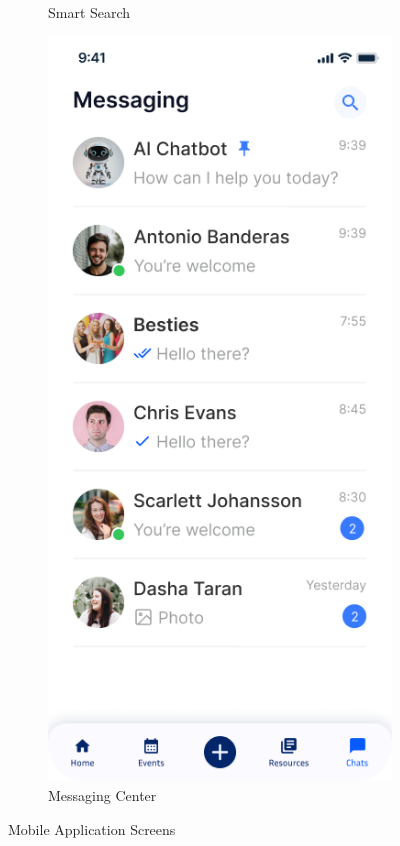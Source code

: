 \begin{figure}[H]
\begin{subfigure}[b]{0.22\textwidth}
        \caption{Smart Search}
        \label{fig:mobile-search}
    \end{subfigure}
    \hfill
    \begin{subfigure}[b]{0.22\textwidth}
        \centering
        \includegraphics[width=\textwidth,height=0.3\textheight,keepaspectratio]{images/front_end_screens/mobile-chats.png}
        \caption{Messaging Center}
        \label{fig:mobile-messaging}
    \end{subfigure}
    \caption{Mobile Application Screens}
    \label{fig:mobile_screens}
\end{figure}

